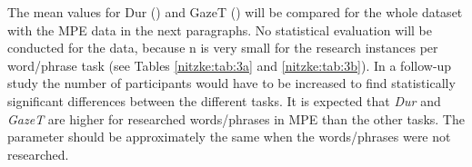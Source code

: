 \documentclass[output=paper]{langsci/langscibook}
\begin{document}
The mean values for Dur () and GazeT () will be compared for the whole dataset with the MPE data in the next paragraphs. No statistical evaluation will be conducted for the data, because n is very small for the research instances per word/phrase task (see Tables \ref{nitzke:tab:3a} and \ref{nitzke:tab:3b}). In a follow-up study the number of participants would have to be increased to find statistically significant differences between the different tasks. It is expected that \textit{Dur }and\textit{ GazeT }are higher for researched words/phrases in MPE than the other tasks. The parameter should be approximately the same when the words/phrases were not researched.

\end{document}
